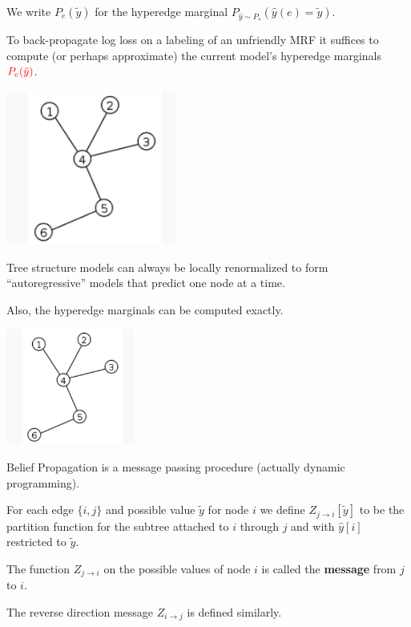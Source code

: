 {\vfill
We write {\color{red} $P_e(\tilde{y})$} for the {\color{red} hyperedge marginal} $P_{\hat{y} \sim P_s}(\hat{y}(e) = \tilde{y})$.

\vfill
To back-propagate log loss on a labeling of an unfriendly MRF {\color{red} it suffices to compute (or perhaps approximate)
the current model's hyperedge marginals ${\color{red} P_e(\tilde{y})}$.}


\centerline{\includegraphics[height= 2in]{../images/Tree}}

\vfill
Tree structure models can always be locally renormalized to form ``autoregressive'' models that
predict one node at a time.

\vfill
Also, the hyperedge marginals can be computed exactly.



\centerline{\includegraphics[height=1.5in]{../images/Tree}}

\vfill
Belief Propagation is a message passing procedure (actually dynamic programming).

\vfill
For each edge $\{i,j\}$ and possible value $\tilde{y}$ for node $i$ we define {\color{red} $Z_{j \rightarrow i}[\tilde{y}]$}
to be  the partition function for the subtree attached to $i$ through $j$ and
with $\hat{y}[i]$ restricted to $\tilde{y}$.

\vfill
The function $Z_{j \rightarrow i}$ on the possible values of node $i$ is called the {\bf message} from $j$ to $i$.

\vfill
The reverse direction message $Z_{i \rightarrow j}$ is defined similarly.

}
